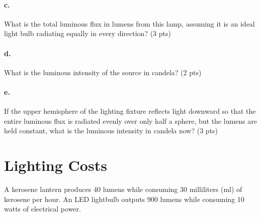 \documentclass{article}
\newif\ifsolution
\newcommand{\solution}[1]
{\ifsolution
\vspace{10pt}
{\color{answer-color} #1}
\else\fi}
\begin{document}
\solution{
Both lux and foot-candles are units of luminous flux per unit area, so
we can convert between them with a unit conversion.
$$ 60 lux \cdot \ufrac{1 fc}{10.76 lux} = 5.58 fc$$
}

\paragraph{c.} What is the total luminous flux in lumens from this lamp, assuming it
is an ideal light bulb radiating equally in every direction? (3 pts)

\solution{
Based on the assumption of uniform illumination at all angles, we
estimate that the total luminous flux is equal to the illuminance
multiplied by the area of the sphere with a radius of 2 meters.
$$ 60 lux \cdot 4 \pi r^2 $$
$$ 60 lux \cdot 4 \cdot 3.14 \cdot 4m^2 = 3014 lumens $$
This is equivalent to two 100 watt incandescent lightbulbs.
}

\paragraph{d.} What is the luminous intensity of the source in candela? (2 pts)

\solution{
Recall that luminous intensity is the lumens per solid angle and that
there are 4$\pi$ or about 12 steradians in sphere.  To get the luminous
intensity we divide the lumens by the solid angle.
$$ 3014 / (4 * 3.14) = 240 candela$$
}

\paragraph{e.} If the upper hemisphere of the lighting fixture reflects light
downward so that the entire luminous flux is radiated evenly over only half a
sphere, but the lumens are held constant, what is the luminous intensity
in candela now? (3 pts)

\solution{
Our fixture reduces the solid angle in which light radiates from the
entire sphere to half a sphere.  This means that the solid angle reduces
from 4$\pi$ to 2$\pi$ steradians or from about 12 to about 6 steradians.
The luminous intensity increases by a factor of 2 to 480 candelas.
}


\section{Lighting Costs}

A kerosene lantern produces 40 lumens while consuming 30 milliliters
(ml) of kerosene
per hour.  An LED lightbulb outputs 900 lumens while consuming 10 watts
of electrical power.
\end{document}
